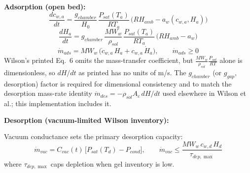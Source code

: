 \documentclass[11pt]{article}
\begin{document}
\textbf{Adsorption (open bed):}
\begin{equation}
\frac{dc_{w,a}}{dt} = \frac{g_{chamber}}{H_0}\,\frac{P_{sat}(T_a)}{RT_a}\,\bigl(RH_{amb} - a_w(c_{w,a}, H_a)\bigr)
\label{eq:massads}
\end{equation}
\begin{equation}
\frac{dH_a}{dt} = g_{chamber}\,\frac{MW_w}{\rho_{sol}}\,\frac{P_{sat}(T_a)}{RT_a}\,\bigl(RH_{amb} - a_w\bigr)
\end{equation}
\begin{equation}
\dot{m}_{ads} = MW_w\,\bigl(\dot{c}_{w,a}\,H_a + c_{w,a}\,\dot{H}_a\bigr), \qquad \dot{m}_{ads} \ge 0
\end{equation}
Wilson's printed Eq.~6 omits the mass-transfer coefficient, but $\frac{MW_w}{\rho_{sol}}\frac{P_{sat}}{RT}$ alone is dimensionless, so $dH/dt$ as printed has no units of m/s. The $g_{chamber}$ (or $g_{gap}$, desorption) factor is required for dimensional consistency and to match the desorption mass-rate identity $\dot{m}_{des} = -\rho_{sol}A_c\,dH/dt$ used elsewhere in Wilson et al.; this implementation includes it.

\textbf{Desorption (vacuum-limited Wilson inventory):}

Vacuum conductance sets the primary desorption capacity:
\begin{equation}
\dot{m}_{vac} = C_{vac}(t)\,\bigl[P_{sat}(T_d) - P_{cond}\bigr],
\qquad
\dot{m}_{vac} \le \frac{MW_w\,c_{w,d}\,H_d}{\tau_{dep,\max}}
\label{eq:massdes}
\end{equation}
where $\tau_{dep,\max}$ caps depletion when gel inventory is low.
\end{document}
